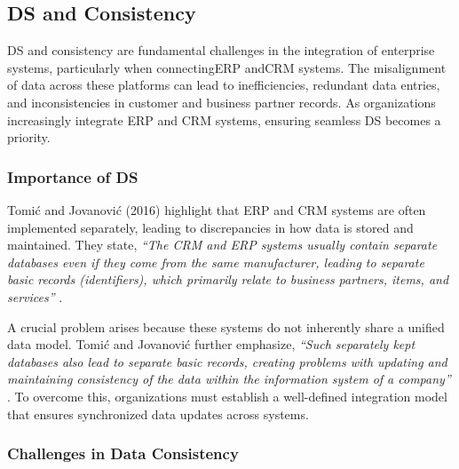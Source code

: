 \subsection{DS and Consistency}
DS and consistency are fundamental challenges in the integration of enterprise systems, particularly when connectingERP andCRM systems. The misalignment of data across these platforms can lead to inefficiencies, redundant data entries, and inconsistencies in customer and business partner records. As organizations increasingly integrate ERP and CRM systems, ensuring seamless DS becomes a priority.

\subsubsection{Importance of DS}

Tomić and Jovanović (2016) highlight that ERP and CRM systems are often implemented separately, leading to discrepancies in how data is stored and maintained. They state, \textit{``The CRM and ERP systems usually contain separate databases even if they come from the same manufacturer, leading to separate basic records (identifiers), which primarily relate to business partners, items, and services''} \cite{tomic2016}.

A crucial problem arises because these systems do not inherently share a unified data model. Tomić and Jovanović further emphasize, \textit{``Such separately kept databases also lead to separate basic records, creating problems with updating and maintaining consistency of the data within the information system of a company''} \cite{tomic2016}. To overcome this, organizations must establish a well-defined integration model that ensures synchronized data updates across systems.

\subsubsection{Challenges in Data Consistency}

